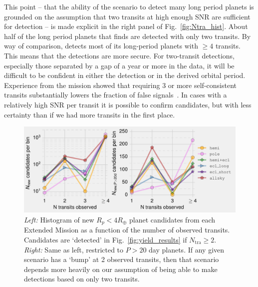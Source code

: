 \begin{enumerate}
	This point -- that the ability of the \hemis\:scenario to detect many long period planets is grounded on the assumption that two transits at high enough SNR are sufficient for detection -- is made explicit in the right panel of Fig.~\ref{fig:Ntra_hist}.
	About half of the long period planets that \hemis\:finds are detected with only two transits.
	By way of comparison, \npole\:detects most of its long-period planets with $\ge 4$ transits.
	This means that the \npole\:detections are more secure.
	For two-transit detections, especially those separated by a gap of a year or more in the \tess data, it will be
        difficult to be confident in either the detection or in the derived 
        orbital period.
        Experience from the \kepler mission showed that requiring 3 or more self-consistent transits substantially lowers the fraction of false signals~\citep{burke_Q1Q8_2014}.
	In cases with a relatively high SNR per transit it is possible to confirm candidates, but with less certainty than if we had more transits in the first place.
	\begin{figure}[!t]
		\centering
		\includegraphics[scale=1.]{figures/Ntra_histogram.pdf}
		\caption{ \textit{Left:} Histogram of new $R_p<4R_\oplus$ planet candidates from each Extended Mission as a function of the number of observed transits.
		Candidates are `detected' in Fig.~\protect\ref{fig:yield_results} if $N_\mathrm{tra}\geq2$.
		\textit{Right:} Same as left, restricted to $P>20$ day planets.
		If any given scenario has a `bump' at 2 observed transits, then that scenario depends more heavily on our assumption of being able to make detections based on only two transits.
}
\end{figure}
\end{enumerate}
